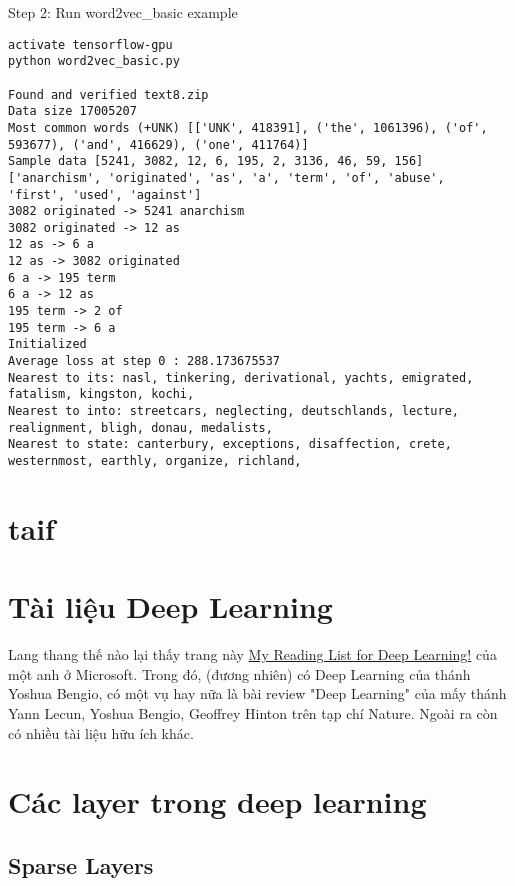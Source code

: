 Step 2: Run word2vec_basic example

\begin{lstlisting}
activate tensorflow-gpu
python word2vec_basic.py

Found and verified text8.zip
Data size 17005207
Most common words (+UNK) [['UNK', 418391], ('the', 1061396), ('of', 593677), ('and', 416629), ('one', 411764)]
Sample data [5241, 3082, 12, 6, 195, 2, 3136, 46, 59, 156] ['anarchism', 'originated', 'as', 'a', 'term', 'of', 'abuse',
'first', 'used', 'against']
3082 originated -> 5241 anarchism
3082 originated -> 12 as
12 as -> 6 a
12 as -> 3082 originated
6 a -> 195 term
6 a -> 12 as
195 term -> 2 of
195 term -> 6 a
Initialized
Average loss at step 0 : 288.173675537
Nearest to its: nasl, tinkering, derivational, yachts, emigrated, fatalism, kingston, kochi,
Nearest to into: streetcars, neglecting, deutschlands, lecture, realignment, bligh, donau, medalists,
Nearest to state: canterbury, exceptions, disaffection, crete, westernmost, earthly, organize, richland,

\end{lstlisting}



\section{taif}

\section{Tài liệu Deep Learning}

Lang thang thế nào lại thấy trang này \href{https://www.microsoft.com/en-us/research/wp-content/uploads/2017/02/DL_Reading_List.pdf}{My Reading List for Deep Learning!} của một anh ở Microsoft. Trong đó, (đương nhiên) có Deep Learning của thánh Yoshua Bengio, có một vụ hay nữa là bài review "Deep Learning" của mấy thánh Yann Lecun, Yoshua Bengio, Geoffrey Hinton trên tạp chí Nature. Ngoài ra còn có nhiều tài liệu hữu ích khác.

\section{Các layer trong deep learning}

\subsection{Sparse Layers}

